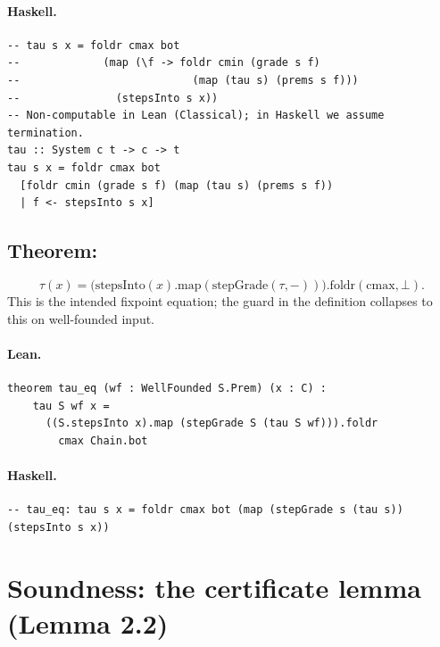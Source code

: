\documentclass[11pt,a4paper]{article}
\begin{document}
\paragraph{Haskell.}
\begin{lstlisting}[style=haskell]
-- tau s x = foldr cmax bot
--             (map (\f -> foldr cmin (grade s f)
--                           (map (tau s) (prems s f)))
--               (stepsInto s x))
-- Non-computable in Lean (Classical); in Haskell we assume termination.
tau :: System c t -> c -> t
tau s x = foldr cmax bot
  [foldr cmin (grade s f) (map (tau s) (prems s f))
  | f <- stepsInto s x]
\end{lstlisting}


\subsection{Theorem: }

\begin{thm}
\[
  \tau(x) = \bigl(\mathrm{stepsInto}(x).\mathrm{map}(\mathrm{stepGrade}(\tau,
  {-}))\bigr).\mathrm{foldr}(\mathrm{cmax}, \bot).
\]
This is the intended fixpoint equation; the  guard in the
definition collapses to this on well-founded input.
\end{thm}

\paragraph{Lean.}
\begin{lstlisting}[style=lean]
theorem tau_eq (wf : WellFounded S.Prem) (x : C) :
    tau S wf x =
      ((S.stepsInto x).map (stepGrade S (tau S wf))).foldr
        cmax Chain.bot
\end{lstlisting}

\paragraph{Haskell.}
\begin{lstlisting}[style=haskell]
-- tau_eq: tau s x = foldr cmax bot (map (stepGrade s (tau s)) (stepsInto s x))
\end{lstlisting}

\section{Soundness: the certificate lemma (Lemma 2.2)}
\end{document}
